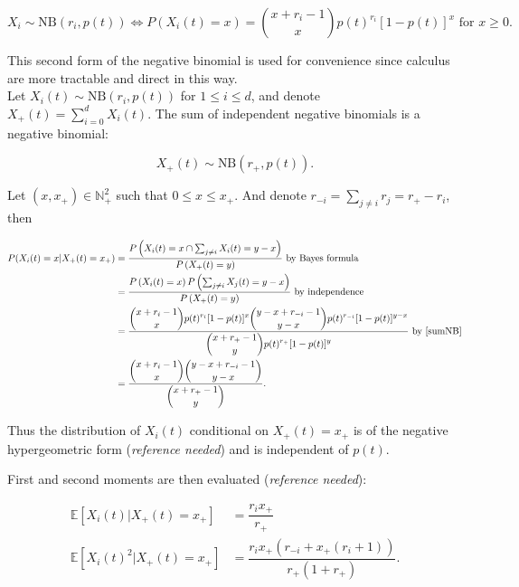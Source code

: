 \documentclass{article}
\begin{document}
\begin{equation}
X_i \sim \textrm{NB}(r_i,p(t)) \iff P(X_i(t)=x)=\binom{x+r_i-1}{x} p(t)^{r_i} [1-p(t)]^{x} \text{ for } x \geq 0.
\end{equation}

This second form of the negative binomial is used for convenience since calculus are more tractable and direct in this way.\\


Let $X_i(t) \sim \textrm{NB}(r_i,p(t))$ for $1 \leq i \leq d$, and denote $X_+(t)=\sum_{i=0}^d X_i(t)$. The sum of independent negative binomials is a negative binomial:

\begin{equation}
 X_+(t)  \sim \textrm{NB} \left( r_+, p(t) \right). \label{sumNB}
\end{equation}


Let $(x,x_+) \in \mathbb{N}_+^2$ such that $0 \leq x \leq x_+$. And denote $ \displaystyle r_{-i}=\sum_{j \neq i} r_j=r_+-r_i$, then

\begin{align}
P( X_i(t)=x \vert X_+(t)=x_+ ) &=\dfrac{P\left( X_i(t)=x \cap \sum_{j \neq i} X_i(t)=y-x \right)}{P\left(X_+(t)=y\right)} \text{ by Bayes formula}\\
 &=\dfrac{P\left(X_i(t)=x\right) P\left(\sum_{j \neq i} X_j(t)=y-x\right)}{P\left(X_+(t)=y\right)} \text{ by independence}\\
 &=\dfrac{\displaystyle \binom{x+r_i-1}{x} p(t)^{r_i} [1-p(t)]^{x} \binom{y-x+r_{-i}-1}{y-x} p(t)^{r_{-i}} [1-p(t)]^{y-x} }{\displaystyle \binom{x+r_+ -1}{y} p(t)^{r_+ } [1-p(t)]^{y}} \text{ by \eqref{sumNB}} \\
 &=\dfrac{\displaystyle \binom{x+r_i-1}{x} \binom{y-x+r_{-i}-1}{y-x}}{\displaystyle \binom{x+r_+ -1}{y}}.
\end{align}
 
 Thus the distribution of $X_i(t)$ conditional on $ X_+(t)=x_+$ is of the negative hypergeometric form (\textit{reference needed}) and is independent of $p(t)$.
 
 First and second moments are then evaluated (\textit{reference needed}): 
 
\begin{align}
\mathbb{E} [ X_i(t) \vert X_+(t)=x_+ ] &=\dfrac{r_i x_+}{r_+ } \\
\mathbb{E} [ X_i(t)^2 \vert X_+(t)=x_+ ] &=\dfrac{r_i x_+ (r_{-i} +x_+ (r_i+1))}{r_+ (1+r_+ )}.
\end{align}
\end{document}
